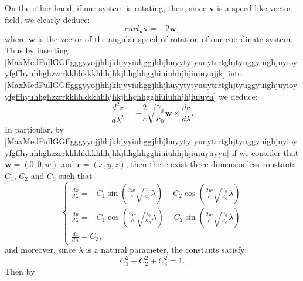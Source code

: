 \documentclass{article}
\theoremstyle{definition}
\theoremstyle{remark}
\renewcommand{\vec}[1]{\mathbf{#1}}
\newcommand{\er}{\eqref}
\newcommand{\er}{\eqref}
\begin{document}
On the other hand, if our system is rotating, then, since $\vec v$
is a speed-like vector field, we clearly deduce:
\begin{equation}\label{MaxMedFullGGffgggyyojjhhjkhjyyiuhggjhhjhuyytytyuuytrrtghjtyuggyuighjuyioyyfgffhyuhhghzzrrkkhhkkkhhhjhkjhhghhgghiuiuhhjhjiuiuyujjk}
curl_{\vec x}\vec v=-2\vec w,
\end{equation}
where $\vec w$ is the vector of the angular speed of rotation of our
coordinate system. Thus by inserting
\er{MaxMedFullGGffgggyyojjhhjkhjyyiuhggjhhjhuyytytyuuytrrtghjtyuggyuighjuyioyyfgffhyuhhghzzrrkkhhkkkhhhjhkjhhghhgghiuiuhhjhjiuiuyujjk}
into
\er{MaxMedFullGGffgggyyojjhhjkhjyyiuhggjhhjhuyytytyuuytrrtghjtyuggyuighjuyioyyfgffhyuhhghzzrrkkhhkkkhhhjhkjhhghhgghiuiuhhjhjiuiuyu}
we deduce:
\begin{equation}\label{MaxMedFullGGffgggyyojjhhjkhjyyiuhggjhhjhuyytytyuuytrrtghjtyuggyuighjuyioyyfgffhyuhhghzzrrkkhhkkkhhhjhkjhhghhgghiuiuhhjhjiuiuyuyyu}
\frac{d^2\vec
r}{d\lambda^2}=-\frac{2}{c}\sqrt{\frac{\gamma_0}{\kappa_0}}\vec
w\times\frac{d\vec r}{d\lambda}.
\end{equation}
In particular, by
\er{MaxMedFullGGffgggyyojjhhjkhjyyiuhggjhhjhuyytytyuuytrrtghjtyuggyuighjuyioyyfgffhyuhhghzzrrkkhhkkkhhhjhkjhhghhgghiuiuhhjhjiuiuyuyyu}
if we consider that $\vec w=(0,0,w)$ and $\vec r=(x,y,z)$, then
there exist three dimensionless constants $C_1$, $C_2$ and $C_3$
such that
\begin{equation}\label{MaxMedFullGGffgggyyojjhhjkhjyyiuhggjhhjhuyytytyuuytrrtghjtyuggyuighjuyioyyfgffhyuhhghzzrrkkhhkkkhhhjhkjhhghhgghiuiuhhjhjiuiuyuyyukkl}
\begin{cases}
\frac{dx}{d\lambda}=-C_1\sin{\left(\frac{2w}{c}\sqrt{\frac{\gamma_0}{\kappa_0}}\lambda\right)}+C_2\cos{\left(\frac{2w}{c}\sqrt{\frac{\gamma_0}{\kappa_0}}\lambda\right)}
\\
\frac{dy}{d\lambda}=-C_1\cos{\left(\frac{2w}{c}\sqrt{\frac{\gamma_0}{\kappa_0}}\lambda\right)}-C_2\sin{\left(\frac{2w}{c}\sqrt{\frac{\gamma_0}{\kappa_0}}\lambda\right)}
\\
\frac{dz}{d\lambda}=C_3,
\end{cases}
\end{equation}
and moreover, since $\lambda$ is a natural parameter, the constants
satisfy:
\begin{equation}\label{MaxMedFullGGffgggyyojjhhjkhjyyiuhggjhhjhuyytytyuuytrrtghjtyuggyuighjuyioyyfgffhyuhhghzzrrkkhhkkkhhhjhkjhhghhgghiuiuhhjhjiuiuyuyyuojk}
C^2_1+C^2_2+C^2_3=1.
\end{equation}
Then by
\end{document}
